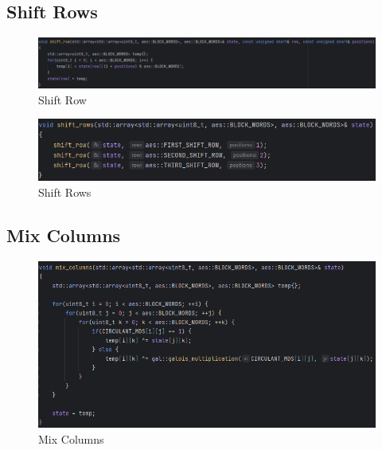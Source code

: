 \subsection{Shift Rows}

\begin{figure}[H]
	\centering
	\includegraphics[width=1\textwidth, height=1\textheight, keepaspectratio]{./images/code/cpp/encryption/shift_row.PNG}
	\caption{Shift Row}
	\label{fig:shift_row}
\end{figure}

\textsf{\small } %

\begin{figure}[H]
	\centering
	\includegraphics[width=1\textwidth, height=1\textheight, keepaspectratio]{./images/code/cpp/encryption/shift_rows.PNG}
	\caption{Shift Rows}
	\label{fig:shift_rows}
\end{figure}

\subsection{Mix Columns}

\textsf{\small } %

\begin{figure}[H]
	\centering
	\includegraphics[width=1\textwidth, height=1\textheight, keepaspectratio]{./images/code/cpp/encryption/mix_columns.PNG}
	\caption{Mix Columns}
	\label{fig:mix_columns}
\end{figure}

